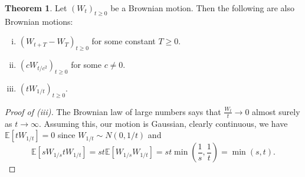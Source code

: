\documentclass{article}
\theoremstyle{definition}
\newtheorem{theorem}{Theorem}[section]
\begin{document}
\begin{theorem}
    Let $(W_t)_{t\ge 0}$ be a Brownian motion. Then the following are also Brownian motions:
    \begin{enumerate}[(i)]
        \item $(W_{t+T}-W_T)_{t\ge 0}$ for some constant $T\ge 0$.
        \item $(c W_{t/c^2})_{t\ge 0}$ for some $c \neq 0$.
        \item $(tW_{1/t})_{t\ge 0}$.
    \end{enumerate}
\end{theorem}
\begin{proof}[Proof of (iii)]
    The Brownian law of large numbers says that $\frac{W_t}{t} \to 0$ almost surely as $t \to \infty$. Assuming this, our motion is Gaussian, clearly continuous, we have $\mathbb{E}[t W_{1/t}]=0$ since $W_{1/t} \sim N(0,1/t)$ and \[
    \mathbb{E}[sW_{1/s}t W_{1/t}] = st \mathbb{E}[W_{1/s}W_{1/t}] = st \min\left(\frac{1}{s},\frac{1}{t}\right) = \min(s,t).
    \]
\end{proof}
\end{document}

